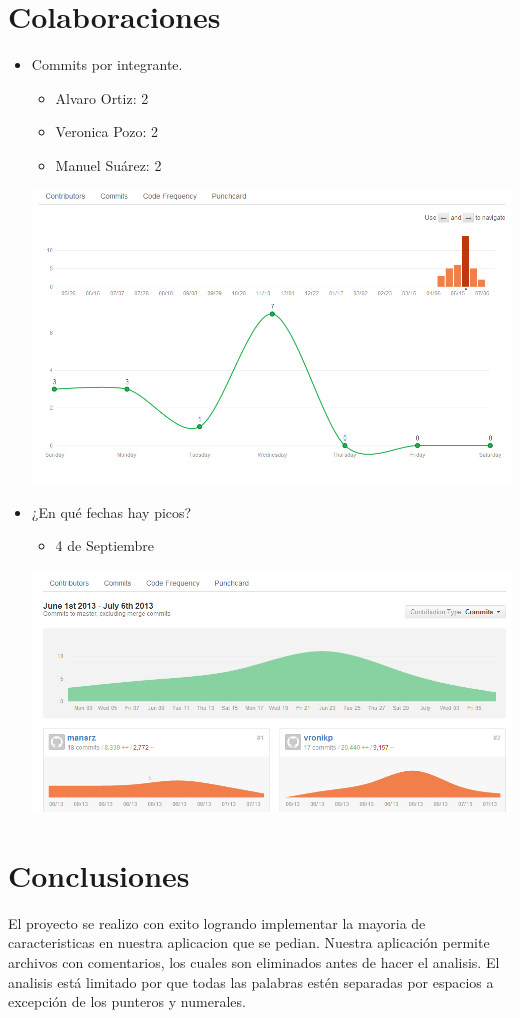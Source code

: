 \documentclass[12pt,oneside]{book}
\begin{document}
\chapter{Colaboraciones}

\begin {itemize}	

\item Commits por integrante.
\begin{itemize}
\item Alvaro Ortiz: 2
\item Veronica Pozo: 2
\item Manuel Suárez: 2

\end{itemize}

\includegraphics[width=1.10\textwidth]{./imagenes/Contribuidores_linea.png}

\item ¿En qué fechas hay picos?
\begin{itemize}
\item 4 de Septiembre
\end{itemize}
	\includegraphics[width=1.10\textwidth]{./imagenes/Contribuidores_commit.png}
\end{itemize}
\chapter{Conclusiones}
El proyecto se realizo con exito logrando implementar la mayoria de caracteristicas en nuestra aplicacion que se pedian. 
Nuestra aplicación permite archivos con comentarios, los cuales son eliminados antes de hacer el analisis. El analisis está limitado por que todas las palabras estén separadas por espacios a excepción de los punteros y numerales.
\end{document}
